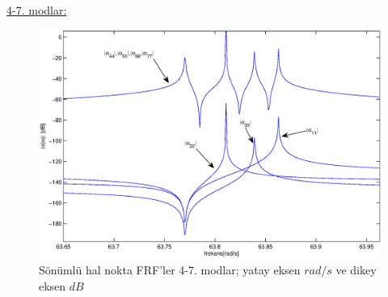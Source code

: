 \documentclass[a4paper]{report}
\begin{document}
\clearpage~\\
\underline{4-7. modlar:}\\
\begin{figure}[H]\shorthandoff{=}
\centerline{
{\includegraphics[width=1.3\textwidth]{./noktaFRFsmod3-7.eps}}}
\caption[Sönümsüz hal nokta FRF'ler]{Sönümlü hal nokta FRF'ler  4-7. modlar; yatay eksen ${rad}/{s}$ ve dikey eksen $dB$ }
\label{fig:noktaFRFs4-7}
\end{figure}
\clearpage
\end{document}
